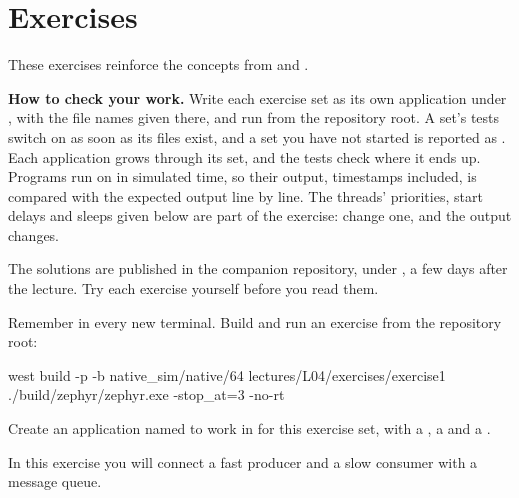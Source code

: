 
\section{Exercises}
\label{c4:sec:exercises}\label{c4:app:c}
These exercises reinforce the concepts from  and .

\begin{aside}
\textbf{How to check your work.} Write each exercise set as its own application under
, with the file names given there, and run  from the
repository root. A set’s tests switch on as soon as its files exist, and a set you have not started
is reported as . Each application grows through its set, and the tests check where it
ends up. Programs run on  in simulated time, so their output, timestamps included,
is compared with the expected output line by line. The threads’ priorities, start delays and sleeps
given below are part of the exercise: change one, and the output changes.

The solutions are published in the companion repository, under
, a few days after the lecture. Try each exercise yourself
before you read them.
\end{aside}

Remember  in every new terminal. Build and run an exercise from the repository
root:

\begin{shell}
west build -p -b native_sim/native/64 lectures/L04/exercises/exercise1
./build/zephyr/zephyr.exe -stop_at=3 -no-rt
\end{shell}

\label{c4:set:1}
Create an application named  to work in for this exercise set, with a
, a  and a .

\label{c4:ex:1.1}
In this exercise you will connect a fast producer and a slow consumer with a message queue.

